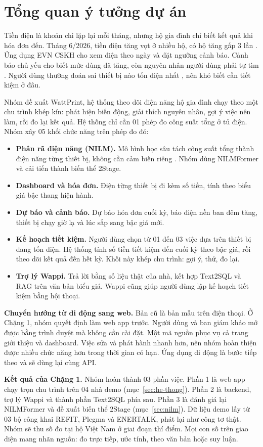 \section{Tổng quan ý tưởng dự án}

Tiền điện là khoản chi lặp lại mỗi tháng, nhưng hộ gia đình chỉ biết kết quả khi hóa đơn đến. Tháng 6/2026, tiền điện tăng vọt ở nhiều hộ, có hộ tăng gấp 3 lần \citep{minhhuyen2026}. Ứng dụng EVN CSKH cho xem điện theo ngày và đặt ngưỡng cảnh báo. Cảnh báo chủ yếu cho biết mức dùng đã tăng, còn nguyên nhân người dùng phải tự tìm \citep{evn2026a}. Người dùng thường đoán sai thiết bị nào tốn điện nhất \citep{attari2010}, nên khó biết cần tiết kiệm ở đâu.

Nhóm đề xuất WattPrint, hệ thống theo dõi điện năng hộ gia đình chạy theo một chu trình khép kín: phát hiện biến động, giải thích nguyên nhân, gợi ý việc nên làm, rồi đo lại kết quả. Hệ thống chỉ cần 01 phép đo công suất tổng ở tủ điện. Nhóm xây 05 khối chức năng trên phép đo đó:
\begin{itemize}
\item \textbf{Phân rã điện năng (NILM).} Mô hình học sâu tách công suất tổng thành điện năng từng thiết bị, không cần cảm biến riêng \citep{hart1992,zoha2012}. Nhóm dùng NILMFormer \citep{petralia2025} và cải tiến thành biến thể 2Stage.
\item \textbf{Dashboard và hóa đơn.} Điện từng thiết bị đi kèm số tiền, tính theo biểu giá bậc thang hiện hành.
\item \textbf{Dự báo và cảnh báo.} Dự báo hóa đơn cuối kỳ, báo điện nền ban đêm tăng, thiết bị chạy giờ lạ và lúc sắp sang bậc giá mới.
\item \textbf{Kế hoạch tiết kiệm.} Người dùng chọn từ 01 đến 03 việc dựa trên thiết bị đang tốn điện. Hệ thống tính số tiền tiết kiệm đến cuối kỳ theo bậc giá, rồi theo dõi kết quả đến hết kỳ. Khối này khép chu trình: gợi ý, thử, đo lại.
\item \textbf{Trợ lý Wappi.} Trả lời bằng số liệu thật của nhà, kết hợp Text2SQL và RAG trên văn bản biểu giá. Wappi cũng giúp người dùng lập kế hoạch tiết kiệm bằng hội thoại.
\end{itemize}

\textbf{Chuyển hướng từ di động sang web.} Bản cũ là bản mẫu trên điện thoại. Ở Chặng 1, nhóm quyết định làm web app trước. Người dùng và ban giám khảo mở được bằng trình duyệt mà không cần cài đặt. Một mã nguồn phục vụ cả trang giới thiệu và dashboard. Việc sửa và phát hành nhanh hơn, nên nhóm hoàn thiện được nhiều chức năng hơn trong thời gian có hạn. Ứng dụng di động là bước tiếp theo và sẽ dùng lại cùng API.

\textbf{Kết quả của Chặng 1.} Nhóm hoàn thành 03 phần việc. Phần 1 là web app chạy trọn chu trình trên 04 nhà demo (mục~\ref{sec:he-thong}). Phần 2 là backend, trợ lý Wappi và thành phần Text2SQL phía sau. Phần 3 là đánh giá lại NILMFormer và đề xuất biến thể 2Stage (mục~\ref{sec:nilm}). Dữ liệu demo lấy từ 03 bộ công khai REFIT, Plegma và ENERTALK, phát lại như công tơ thật. Nhóm sẽ thu số đo tại hộ Việt Nam ở giai đoạn thí điểm. Mọi con số trên giao diện mang nhãn nguồn: đo trực tiếp, ước tính, theo văn bản hoặc suy luận.
